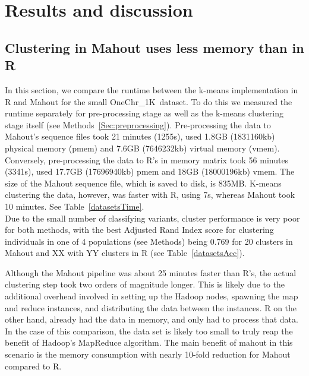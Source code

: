 \documentclass[twocolumn]{bmcart}%
\newcommand{\OneReal}{OneChr\_1K}
\begin{document}







\section*{Results and discussion}

\subsection*{Clustering in Mahout uses less memory than in R}
In this section, we compare the runtime between the k-means implementation in R and Mahout for the small \OneReal\ dataset. 
To do this we measured the runtime separately for pre-processing stage as well as the k-means clustering stage itself (see Methods~\ref{Sec:preprocessing}). 
Pre-processing the data to Mahout's sequence files took 21 minutes (1255s), used 1.8GB (1831160kb) physical memory (pmem) and 7.6GB (7646232kb) virtual memory (vmem).
Conversely,  pre-processing the data to R's in memory matrix took  56 minutes (3341s), used 17.7GB (17696940kb) pmem and 18GB (18000196kb) vmem. 
The size of the Mahout sequence file, which is saved to disk, is 835MB. 
K-means clustering the data, however, was faster with R, using 7s, whereas Mahout took 10 minutes. See Table~\ref{datasetsTime}. \\
Due to the small number of classifying variants, cluster performance is very poor for both methods, with the best Adjusted Rand Index score for clustering individuals in one of 4 populations (see Methods) being 0.769 for 20 clusters in Mahout and XX with YY clusters in R (see Table~\ref{datasetsAcc}).

Although the Mahout pipeline was about 25 minutes faster than R's, the actual clustering step took two orders of magnitude longer. 
This is likely due to the additional overhead involved in setting up the Hadoop nodes, spawning the map and reduce instances, and distributing the data between the instances. 
R on the other hand, already had the data in memory, and only had to process that data. 
In the case of this comparison, the data set is likely too small to truly reap the benefit of Hadoop's MapReduce algorithm. 
The main benefit of mahout in this scenario is the memory consumption with nearly 10-fold reduction for Mahout compared to R. 
\end{document}
